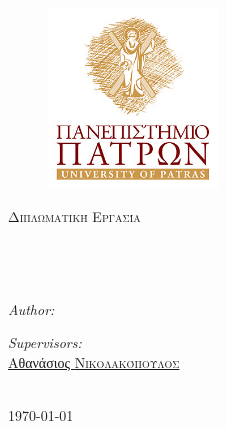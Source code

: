 \documentclass[11pt, english, singlespacing, parskip, headsepline]{MastersDoctoralThesis}
\author{Γεώργιος \textsc{Παπανικολάου}}
\begin{document}
\frontmatter
\pagestyle{plain}

\begin{titlepage}
\begin{center}

\begin{figure}[H]
\centering
\includegraphics[width=0.4\textwidth]{Upatras.jpg}
\end{figure}

\textsc{\Large Διπλωματική Εργασία}\\[0.5cm]

\HRule \\[0.4cm] %
{\huge \bfseries \ttitle}\\[0.4cm] 
\HRule \\[1.5cm] %
 
\begin{minipage}{0.4\textwidth}
\begin{flushleft} \large
\emph{Author:}\\
\href{http://www.github.com/papanikge}{\authorname}
\end{flushleft}
\end{minipage}
\begin{minipage}{0.4\textwidth}
\begin{flushright} \large
\emph{Supervisors:} \\
\href{http://athos.cti.gr/garofalakis/}{\supname}
\href{http://athos.cti.gr/nikolako/}{Αθανάσιος \textsc{Νικολακόπουλος}}
\end{flushright}
\end{minipage}\\[3cm]
 
{\large \today}\\[4cm]
 
\vfill
\end{center}
\end{titlepage}


\newpage\null\thispagestyle{empty}\newpage
\vspace*{0.2\textheight}
\end{document}
